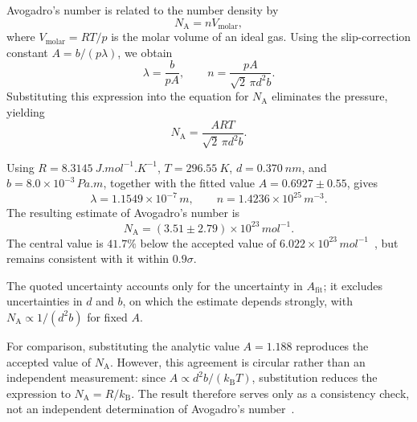 \documentclass[12pt,a4paper]{article}
\begin{document}
Avogadro's number is related to the number density by
\[
N_{\mathrm{A}} = nV_{\text{molar}},
\]
where $V_{\text{molar}}=RT/p$ is the molar volume of an ideal gas.
Using the slip-correction constant $A=b/(p\lambda)$, we obtain
\[
\lambda = \frac{b}{pA},
\qquad
n = \frac{pA}{\sqrt{2}\,\pi d^2b}.
\]
Substituting this expression into the equation for $N_{\mathrm{A}}$
eliminates the pressure, yielding
\[
\boxed{
N_{\mathrm{A}} = \frac{ART}{\sqrt{2}\,\pi d^2b}
}.
\]

Using $R=\SI{8.3145}{J.mol^{-1}.K^{-1}}$,
$T=\SI{296.55}{K}$, $d=\SI{0.370}{nm}$, and
$b=8.0\times10^{-3}\,\si{Pa.m}$, together with the fitted value
$A=0.6927\pm0.55$, gives
\[
\lambda = 1.1549\times10^{-7}\,\si{m},
\qquad
n = 1.4236\times10^{25}\,\si{m^{-3}}.
\]
The resulting estimate of Avogadro's number is
\[
\boxed{
N_{\mathrm{A}} = (3.51\pm2.79)\times10^{23}\,\si{mol^{-1}}
}.
\]
The central value is $41.7\%$ below the accepted value of
$6.022\times10^{23}\,\si{mol^{-1}}$~\cite{Perrin1914}, but remains
consistent with it within $0.9\sigma$.

The quoted uncertainty accounts only for the uncertainty in
$A_{\text{fit}}$; it excludes uncertainties in $d$ and $b$, on which
the estimate depends strongly, with
$N_{\mathrm{A}}\propto 1/(d^2b)$ for fixed $A$.

For comparison, substituting the analytic value $A=1.188$ reproduces
the accepted value of $N_{\mathrm{A}}$. However, this agreement is
circular rather than an independent measurement: since
$A\propto d^2b/(k_{\mathrm{B}}T)$, substitution reduces the expression
to $N_{\mathrm{A}}=R/k_{\mathrm{B}}$. The result therefore serves only
as a consistency check, not an independent determination of
Avogadro's number~\cite{millikan1917electron}.
\end{document}
